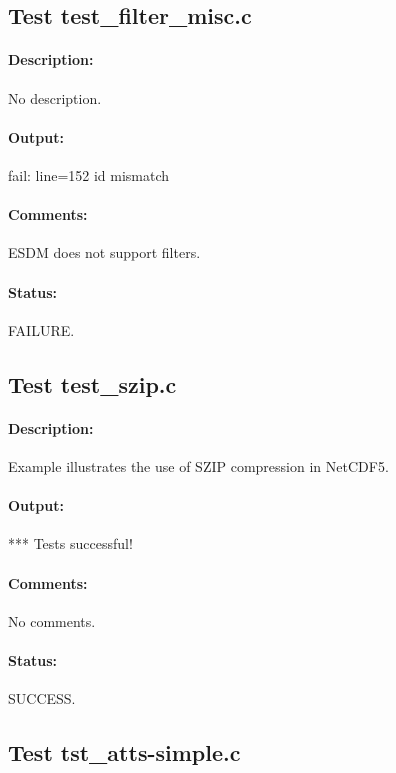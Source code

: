 \subsection{Test test\_filter\_misc.c}

\paragraph{Description:} No description.

\paragraph{Output:} fail: line=152 id mismatch

\paragraph{Comments:} ESDM does not support filters.

\paragraph{Status:} FAILURE.

\subsection{Test test\_szip.c}

\paragraph{Description:} Example illustrates the use of SZIP compression in NetCDF5.

\paragraph{Output:} *** Tests successful!

\paragraph{Comments:} No comments.

\paragraph{Status:} SUCCESS.

\subsection{Test tst\_atts-simple.c}

